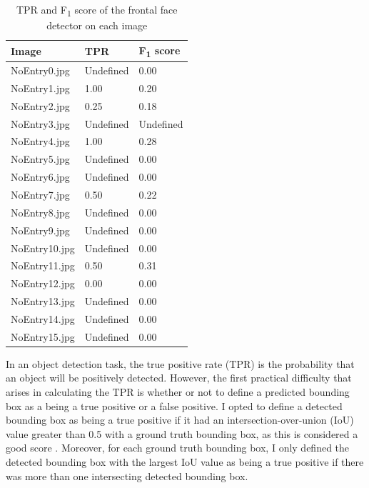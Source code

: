\documentclass[onecolumn, 11pt, a4paper]{article}
\begin{document}
\begin{table}
  \vspace{-2.5em}
  \begin{center}
  \caption{TPR and F\textsubscript{1} score of the frontal face detector on each image}\label{tab:face}
  \begin{tabular}{l l l} 
    \hline\hline
    Image & TPR & F\textsubscript{1} score\\
    \hline
    NoEntry0.jpg & Undefined & 0.00 \\ 
    NoEntry1.jpg & 1.00 & 0.20 \\ 
    NoEntry2.jpg & 0.25 & 0.18 \\ 
    NoEntry3.jpg & Undefined & Undefined \\ 
    NoEntry4.jpg & 1.00 & 0.28 \\ 
    NoEntry5.jpg & Undefined & 0.00 \\ 
    NoEntry6.jpg & Undefined & 0.00 \\ 
    NoEntry7.jpg & 0.50 & 0.22 \\ 
    NoEntry8.jpg & Undefined & 0.00 \\ 
    NoEntry9.jpg & Undefined & 0.00 \\ 
    NoEntry10.jpg & Undefined & 0.00 \\ 
    NoEntry11.jpg & 0.50 & 0.31 \\ 
    NoEntry12.jpg & 0.00 & 0.00 \\ 
    NoEntry13.jpg & Undefined & 0.00 \\ 
    NoEntry14.jpg & Undefined & 0.00 \\ 
    NoEntry15.jpg & Undefined & 0.00 \\ 
    \hline
  \end{tabular}
  \end{center}
\end{table} 

In an object detection task, the true positive rate (TPR) is the probability that an object will be positively detected.
However, the first practical difficulty that arises in calculating the TPR is whether or not to define a predicted bounding box as a being a true positive or a false positive.
I opted to define a detected bounding box as being a true positive if it had an intersection-over-union (IoU) value greater than 0.5 with a ground truth bounding box, as this is considered a good score \cite{iou}.
Moreover, for each ground truth bounding box, I only defined the detected bounding box with the largest IoU value as being a true positive if there was more than one intersecting detected bounding box.
\end{document}
